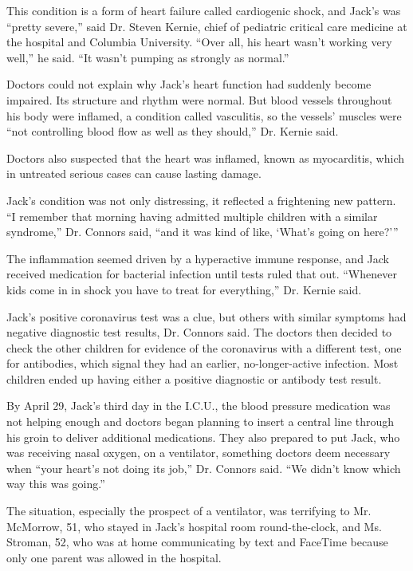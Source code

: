 This condition is a form of heart failure called cardiogenic shock, and
Jack's was ``pretty severe,'' said Dr. Steven Kernie, chief of pediatric
critical care medicine at the hospital and Columbia University. ``Over
all, his heart wasn't working very well,'' he said. ``It wasn't pumping
as strongly as normal.''

Doctors could not explain why Jack's heart function had suddenly become
impaired. Its structure and rhythm were normal. But blood vessels
throughout his body were inflamed, a condition called vasculitis, so the
vessels' muscles were ``not controlling blood flow as well as they
should,'' Dr. Kernie said.

Doctors also suspected that the heart was inflamed, known as
myocarditis, which in untreated serious cases can cause lasting damage.

Jack's condition was not only distressing, it reflected a frightening
new pattern. ``I remember that morning having admitted multiple children
with a similar syndrome,'' Dr. Connors said, ``and it was kind of like,
`What's going on here?'''

The inflammation seemed driven by a hyperactive immune response, and
Jack received medication for bacterial infection until tests ruled that
out. ``Whenever kids come in in shock you have to treat for
everything,'' Dr. Kernie said.

Jack's positive coronavirus test was a clue, but others with similar
symptoms had negative diagnostic test results, Dr. Connors said. The
doctors then decided to check the other children for evidence of the
coronavirus with a different test, one for antibodies, which signal they
had an earlier, no-longer-active infection. Most children ended up
having either a positive diagnostic or antibody test result.

By April 29, Jack's third day in the I.C.U., the blood pressure
medication was not helping enough and doctors began planning to insert a
central line through his groin to deliver additional medications. They
also prepared to put Jack, who was receiving nasal oxygen, on a
ventilator, something doctors deem necessary when ``your heart's not
doing its job,'' Dr. Connors said. ``We didn't know which way this was
going.''

The situation, especially the prospect of a ventilator, was terrifying
to Mr. McMorrow, 51, who stayed in Jack's hospital room round-the-clock,
and Ms. Stroman, 52, who was at home communicating by text and FaceTime
because only one parent was allowed in the hospital.


